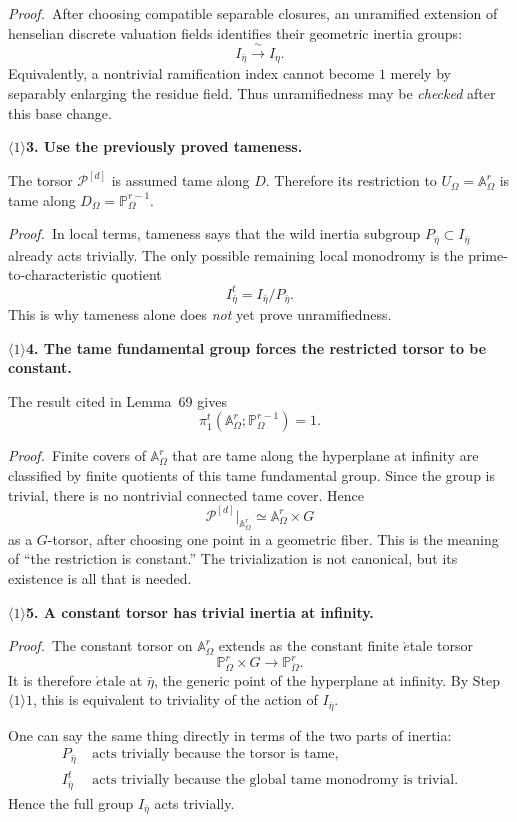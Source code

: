\documentclass[11pt]{article}
\newcommand{\cP}{\mathcal P}
\newcommand{\step}[2]{\par\medskip\noindent
  \textcolor{heading}{\textbf{\(\langle #1\rangle\)#2}}\quad}
\newcommand{\pf}{\par\smallskip\noindent\textit{Proof.}\ }
\begin{document}
\pf After choosing compatible separable closures, an unramified extension
of henselian discrete valuation fields identifies their geometric inertia
groups:
\[
  I_{\bar\eta}\xrightarrow{\ \sim\ } I_\eta.
\]
Equivalently, a nontrivial ramification index cannot become $1$ merely by
separably enlarging the residue field.  Thus unramifiedness may be
\emph{checked} after this base change.

\step{1}{3. Use the previously proved tameness.}

The torsor $\cP^{[d]}$ is assumed tame along $D$.  Therefore its restriction
to $U_\Omega=\mathbb A^r_\Omega$ is tame along
$D_\Omega=\mathbb P^{r-1}_\Omega$.

\pf In local terms, tameness says that the wild inertia subgroup
$P_{\bar\eta}\subset I_{\bar\eta}$ already acts trivially.  The only
possible remaining local monodromy is the prime-to-characteristic quotient
\[
  I^{t}_{\bar\eta}=I_{\bar\eta}/P_{\bar\eta}.
\]
This is why tameness alone does \emph{not} yet prove unramifiedness.

\step{1}{4. The tame fundamental group forces the restricted torsor to be constant.}

The result cited in Lemma~69 gives
\[
  \pi_1^t\!\left(
    \mathbb A^r_\Omega;\mathbb P^{r-1}_\Omega
  \right)=1.
\]

\pf Finite covers of $\mathbb A^r_\Omega$ that are tame along the
hyperplane at infinity are classified by finite quotients of this tame
fundamental group.  Since the group is trivial, there is no nontrivial
connected tame cover.  Hence
\[
  \cP^{[d]}|_{\mathbb A^r_\Omega}
  \simeq \mathbb A^r_\Omega\times G
\]
as a $G$-torsor, after choosing one point in a geometric fiber.  This is the
meaning of ``the restriction is constant.''  The trivialization is not
canonical, but its existence is all that is needed.

\step{1}{5. A constant torsor has trivial inertia at infinity.}

\pf The constant torsor on $\mathbb A^r_\Omega$ extends as the constant
finite \(\acute{e}\)tale torsor
\[
  \mathbb P^r_\Omega\times G\longrightarrow\mathbb P^r_\Omega.
\]
It is therefore \(\acute{e}\)tale at $\bar\eta$, the generic point of the
hyperplane at infinity.  By Step~$\langle1\rangle1$, this is equivalent to
triviality of the action of $I_{\bar\eta}$.

One can say the same thing directly in terms of the two parts of inertia:
\begin{align*}
  P_{\bar\eta}&\text{ acts trivially because the torsor is tame},\\
  I^t_{\bar\eta}&\text{ acts trivially because the global tame monodromy is
                       trivial}.
\end{align*}
Hence the full group $I_{\bar\eta}$ acts trivially.
\end{document}
